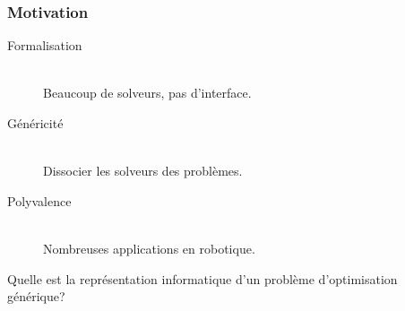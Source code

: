 \documentclass[14pt,utf8,hyperref={pdfpagelabels=false}]{beamer}
\begin{document}
\begin{slideDecision}
  \begin{changeleftmargin}{1.1cm}
    \frametitle{Motivation}


    \begin{center}
      \begin{description}
        \item[Formalisation]~\\
          Beaucoup de solveurs, pas d'interface.
        \item[Généricité]~\\
          Dissocier les solveurs des problèmes.
        \item[Polyvalence]~\\
          Nombreuses applications en robotique.
      \end{description}
    \end{center}
    \vspace{1cm}
    Quelle est la \alert{représentation informatique} d'un problème
    d'optimisation générique?
  \end{changeleftmargin}
\end{slideDecision}
\end{document}
